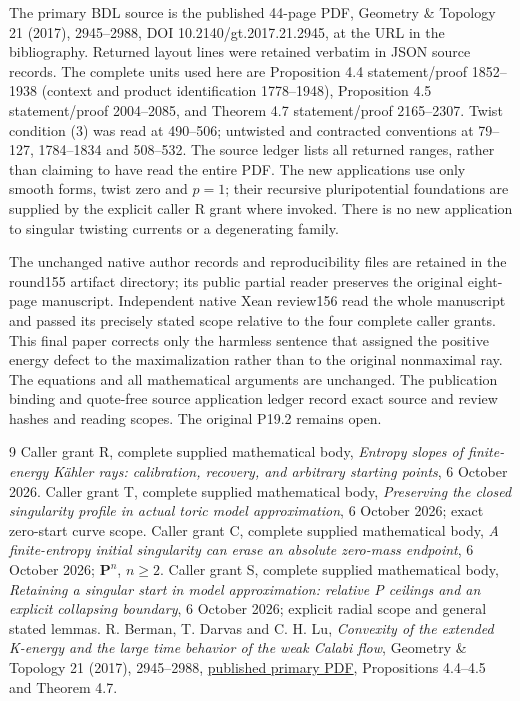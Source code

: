 \documentclass[11pt]{article}
\begin{document}
The primary BDL source is the published 44-page PDF,
Geometry \& Topology 21 (2017), 2945--2988, DOI
10.2140/gt.2017.21.2945, at the URL in the bibliography.
Returned layout lines were retained verbatim in JSON source records.
The complete units used here are Proposition 4.4 statement/proof
1852--1938 (context and product identification 1778--1948),
Proposition 4.5 statement/proof 2004--2085, and Theorem 4.7
statement/proof 2165--2307. Twist condition (3) was read at
490--506; untwisted and contracted conventions at 79--127,
1784--1834 and 508--532. The source ledger lists all returned
ranges, rather than claiming to have read the entire PDF.
The new applications use only smooth forms, twist zero and $p=1$;
their recursive pluripotential foundations are supplied by the
explicit caller R grant where invoked. There is no new application
to singular twisting currents or a degenerating family.

The unchanged native author records and reproducibility files are retained
in the round155 artifact directory; its public partial reader preserves
the original eight-page manuscript. Independent native Xean review156
read the whole manuscript and passed its precisely stated scope relative
to the four complete caller grants. This final paper corrects only the
harmless sentence that assigned the positive energy defect to the
maximalization rather than to the original nonmaximal ray. The equations
and all mathematical arguments are unchanged. The publication binding
and quote-free source application ledger record exact source and review
hashes and reading scopes. The original P19.2 remains open.

\begin{thebibliography}{9}
 Caller grant R, complete supplied mathematical body,
\emph{Entropy slopes of finite-energy K\"ahler rays: calibration,
recovery, and arbitrary starting points}, 6 October 2026.
 Caller grant T, complete supplied mathematical body,
\emph{Preserving the closed singularity profile in actual toric
model approximation}, 6 October 2026; exact zero-start curve scope.
 Caller grant C, complete supplied mathematical body,
\emph{A finite-entropy initial singularity can erase an absolute
zero-mass endpoint}, 6 October 2026; $\mathbf P^n$, $n\ge2$.
 Caller grant S, complete supplied mathematical body,
\emph{Retaining a singular start in model approximation:
relative P ceilings and an explicit collapsing boundary},
6 October 2026; explicit radial scope and general stated lemmas.
 R. Berman, T. Darvas and C. H. Lu,
\emph{Convexity of the extended K-energy and the large time behavior
of the weak Calabi flow}, Geometry \& Topology 21 (2017), 2945--2988,
\href{https://msp.org/gt/2017/21-5/gt-v21-n5-p08-s.pdf}{published primary PDF},
Propositions 4.4--4.5 and Theorem 4.7.
\end{thebibliography}
\end{document}
